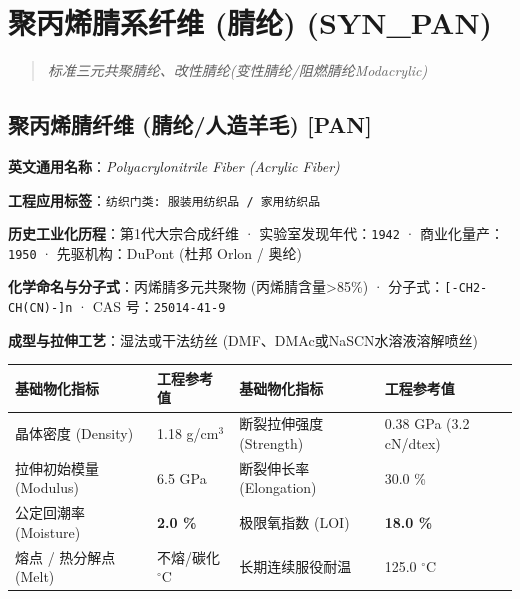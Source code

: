 \documentclass[11pt,openright,twoside,UTF8]{ctexbook}
\begin{document}
\chapter{聚丙烯腈系纤维 (腈纶) (SYN\_PAN)}
\begin{quote}
\small\itshape
标准三元共聚腈纶、改性腈纶(变性腈纶/阻燃腈纶Modacrylic)
\end{quote}

\section{聚丙烯腈纤维 (腈纶/人造羊毛) [PAN]}
\label{sec:pan}

\noindent\textbf{英文通用名称}：\textit{Polyacrylonitrile Fiber (Acrylic Fiber)}\par
\noindent\textbf{工程应用标签}：\texttt{纺织门类: 服装用纺织品 / 家用纺织品}\par
\noindent\textbf{历史工业化历程}：第1代大宗合成纤维 · 实验室发现年代：\texttt{1942} · 商业化量产：\texttt{1950} · 先驱机构：DuPont (杜邦 Orlon / 奥纶)\par
\noindent\textbf{化学命名与分子式}：丙烯腈多元共聚物 (丙烯腈含量\textgreater{}85\%) · 分子式：\texttt{[-CH2-CH(CN)-]n} · CAS 号：\texttt{25014-41-9}\par
\noindent\textbf{成型与拉伸工艺}：湿法或干法纺丝 (DMF、DMAc或NaSCN水溶液溶解喷丝)\par

\vspace{0.15cm}
\begin{center}
\small
\begin{tabularx}{\textwidth}{p{3.8cm}Xp{3.8cm}X}
\toprule
\textbf{基础物化指标} & \textbf{工程参考值} & \textbf{基础物化指标} & \textbf{工程参考值} \\
\midrule
晶体密度 (Density) & 1.18 g/cm$^3$ & 断裂拉伸强度 (Strength) & 0.38 GPa (3.2 cN/dtex) \\
拉伸初始模量 (Modulus) & 6.5 GPa & 断裂伸长率 (Elongation) & 30.0 \% \\
公定回潮率 (Moisture) & \textbf{2.0 \%} & 极限氧指数 (LOI) & \textbf{18.0 \%} \\
熔点 / 热分解点 (Melt) & 不熔/碳化 $^\circ\mathrm{C}$ & 长期连续服役耐温 & 125.0 $^\circ\mathrm{C}$ \\
\bottomrule
\end{tabularx}
\end{center}
\vspace{0.15cm}
\end{document}
